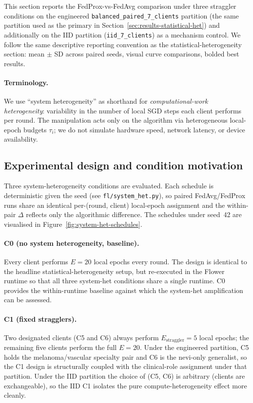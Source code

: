 This section reports the FedProx-vs-FedAvg comparison under three
straggler conditions on the engineered \texttt{balanced\_paired\_7\_clients}
partition (the same partition used as the primary in
Section~\ref{sec:results-statistical-het}) and additionally on the IID
partition (\texttt{iid\_7\_clients}) as a mechanism control. We follow
the same descriptive reporting convention as the
statistical-heterogeneity section: mean $\pm$ SD across paired seeds,
visual curve comparisons, bolded best results.

\paragraph{Terminology.}
We use ``system heterogeneity'' as shorthand for
\emph{computational-work heterogeneity}: variability in the number of
local SGD steps each client performs per round. The manipulation acts
only on the algorithm via heterogeneous local-epoch budgets $\tau_i$;
we do not simulate hardware speed, network latency, or device
availability.

\subsection{Experimental design and condition motivation}
\label{sec:system-het-conditions}

Three system-heterogeneity conditions are evaluated. Each schedule is
deterministic given the seed (see \texttt{fl/system\_het.py}), so
paired FedAvg/FedProx runs share an identical per-(round, client)
local-epoch assignment and the within-pair $\Delta$ reflects only the
algorithmic difference. The schedules under seed~42 are visualised in
Figure~\ref{fig:system-het-schedules}.

\paragraph{C0 (no system heterogeneity, baseline).}
Every client performs $E = 20$ local epochs every round. The design
is identical to the headline statistical-heterogeneity setup, but
re-executed in the Flower runtime so that all three system-het
conditions share a single runtime. C0 provides the within-runtime
baseline against which the system-het amplification can be assessed.

\paragraph{C1 (fixed stragglers).}
Two designated clients (C5 and C6) always perform
$E_{\text{straggler}} = 5$ local epochs; the remaining five clients
perform the full $E = 20$. Under the engineered partition, C5 holds
the melanoma/vascular specialty pair and C6 is the nevi-only
generalist, so the C1 design is structurally coupled with the
clinical-role assignment under that partition. Under the IID partition
the choice of (C5, C6) is arbitrary (clients are exchangeable), so the
IID C1 isolates the pure compute-heterogeneity effect more cleanly.

